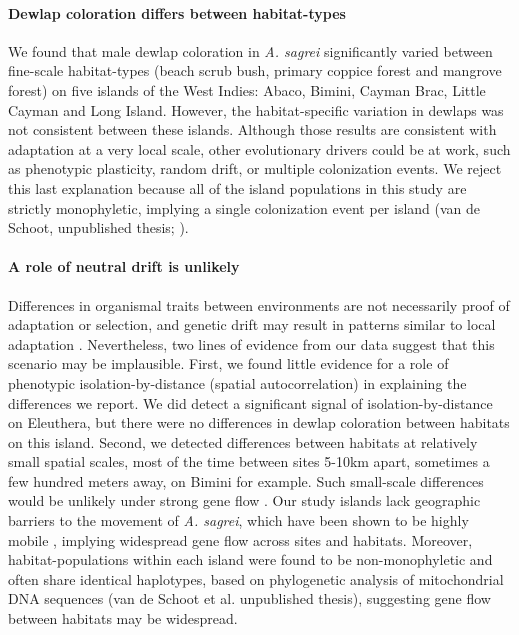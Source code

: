 

\paragraph{Dewlap coloration differs between habitat-types} We found that male dewlap coloration in \textit{A. sagrei} significantly varied between fine-scale habitat-types (beach scrub bush, primary coppice forest and mangrove forest) on five islands of the West Indies: Abaco, Bimini, Cayman Brac, Little Cayman and Long Island. However, the habitat-specific variation in dewlaps was not consistent between these islands. Although those results are consistent with adaptation at a very local scale, other evolutionary drivers could be at work, such as phenotypic plasticity, random drift, or multiple colonization events. We reject this last explanation because all of the island populations in this study are strictly monophyletic, implying a single colonization event per island (van de Schoot, unpublished thesis; \citealt{Driessens2017, Reynolds2020}).

\paragraph{A role of neutral drift is unlikely} Differences in organismal traits between environments are not necessarily proof of adaptation or selection, and genetic drift may result in patterns similar to local adaptation \citep{Miles2019}. Nevertheless, two lines of evidence from our data suggest that this scenario may be implausible. First, we found little evidence for a role of phenotypic isolation-by-distance (spatial autocorrelation) in explaining the differences we report. We did detect a significant signal of isolation-by-distance on Eleuthera, but there were no differences in dewlap coloration between habitats on this island. Second, we detected differences between habitats at relatively small spatial scales, most of the time between sites 5-10km apart, sometimes a few hundred meters away, on Bimini for example. Such small-scale differences would be unlikely under strong gene flow \citep{Richardson2014}. Our study islands lack geographic barriers to the movement of \textit{A. sagrei}, which have been shown to be highly mobile \citep{Kamath2018}, implying widespread gene flow across sites and habitats. Moreover, habitat-populations within each island were found to be non-monophyletic and often share identical haplotypes, based on phylogenetic analysis of mitochondrial DNA sequences (van de Schoot et al. unpublished thesis), suggesting gene flow between habitats may be widespread.\\

